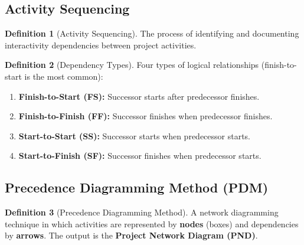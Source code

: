 \documentclass[11pt,a4paper]{article}
\theoremstyle{definition}
\newtheorem{definition}{Definition}[section]
\theoremstyle{plain}
\begin{document}
\subsection{Activity Sequencing}

\begin{definition}[Activity Sequencing]
The process of identifying and documenting interactivity dependencies between project activities.
\end{definition}

\begin{definition}[Dependency Types]
Four types of logical relationships (finish-to-start is the most common):
\begin{enumerate}[nosep,label=\arabic*.]
  \item \textbf{Finish-to-Start (FS):} Successor starts after predecessor finishes.
  \item \textbf{Finish-to-Finish (FF):} Successor finishes when predecessor finishes.
  \item \textbf{Start-to-Start (SS):} Successor starts when predecessor starts.
  \item \textbf{Start-to-Finish (SF):} Successor finishes when predecessor starts.
\end{enumerate}
\end{definition}

\subsection{Precedence Diagramming Method (PDM)}

\begin{definition}[Precedence Diagramming Method]
A network diagramming technique in which activities are represented by \textbf{nodes} (boxes) and dependencies by \textbf{arrows}. The output is the \textbf{Project Network Diagram (PND)}.
\end{definition}

\begin{center}
\end{center}
\end{document}
